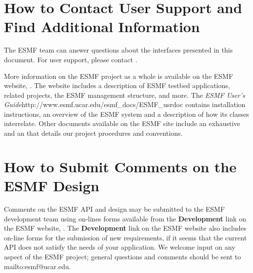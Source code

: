 \section{How to Contact User Support and Find Additional Information}
\label{sec:Support}
The ESMF team can answer questions about the interfaces presented in this 
document.  For user support, please contact 
.  

More information on the ESMF project as a whole is available on the 
ESMF website, .  
The website includes a description of ESMF testbed applications, related projects,
the ESMF management structure, and more.  The \htmladdnormallink
{{\it ESMF User's Guide}}{http://www.esmf.ucar.edu/esmf_docs/ESMF_usrdoc} contains 
installation instructions, an overview of the ESMF system and a description of 
how its classes interrelate.
Other documents available on the ESMF site include an exhaustive
and an  
that details our project procedures and conventions.
 
\section{How to Submit Comments on the ESMF Design}
\label{sec:Submission}
Comments on the ESMF API and design may be submitted to the ESMF development team
using on-lines forms available from the {\bf Development} link on the ESMF 
website, .  
The {\bf Development} 
link on the ESMF website also includes on-line forms for the submission of 
new requirements, if it seems that the current API does not satisfy the needs of 
your application.  We welcome input on any aspect of the ESMF project; general
questions and comments should be sent to 
{mailto:esmf@ucar.edu}.







